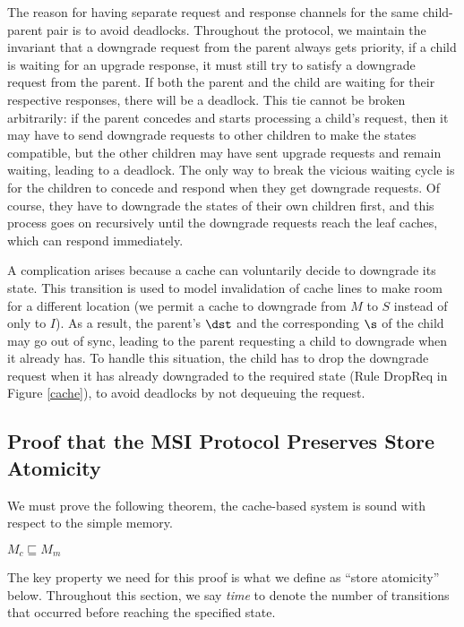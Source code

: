 The reason for having separate request and response channels for the same
child-parent pair is to avoid deadlocks. Throughout the protocol, we maintain
the invariant that a downgrade request from the parent always gets priority,
\ie{} if a child is waiting for an upgrade response, it must still try to
satisfy a downgrade request from the parent. If both the parent and the child
are waiting for their respective responses, there will be a deadlock. This tie
cannot be broken arbitrarily: if the parent concedes and starts processing a
child's request, then it may have to send downgrade requests to other children
to make the states compatible, but the other children may have sent upgrade
requests and remain waiting, leading to a deadlock. The only way to break the
vicious waiting cycle is for the children to concede and respond when they get
downgrade requests. Of course, they have to downgrade the states of their own
children first, and this process goes on recursively until the downgrade
requests reach the leaf caches, which can respond immediately.

A complication arises because a cache can voluntarily decide to downgrade its
state.  This transition is used to model invalidation of cache lines to make
room for a different location (we permit a cache to downgrade from $M$ to $S$
instead of only to $I$).
As a result, the parent's $\dst$ and the
corresponding $\s$ of the child may go out of sync, leading to the parent
requesting a child to downgrade when it already has. To handle this situation,
the child has to drop the downgrade request when it has already downgraded to
the required state (Rule DropReq in Figure \ref{cache}), to avoid deadlocks
by not dequeuing the request.



\subsection{Proof that the MSI Protocol Preserves Store Atomicity}\label{sec:ccproof}
\label{safety}

We must prove the following theorem, \ie{} the cache-based system is sound with
respect to the simple memory.
\begin{theorem}
\label{ccorrect}
$M_c \sqsubseteq M_m$
\end{theorem}

The key property we need for this proof is what we define as
``store atomicity'' below. Throughout this section, we say
\emph{time} to denote the number of transitions that occurred before reaching
the specified state.


